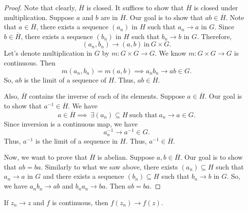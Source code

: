\begin{proof}
    Note that clearly, \( \overline{H} \) is closed. It suffices to show that \( \overline{H} \) is closed under multiplication. Suppose \( a  \) and \( b  \) are in \( \overline{H} \). Our goal is to show that \( ab \in \overline{H} \). Note that \( a \in \overline{H} \), there exists a sequence \( ({a}_{n}) \) in \( H  \) such that \( {a}_{n} \to a  \) in \( G  \). Since \( b \in \overline{H} \), there exists a sequence \( ({b}_{n}) \) in \( H  \) such that \( {b}_{n} \to b  \) in \( G  \). Therefore,
    \[  ({a}_{n}, {b}_{n}) \to (a,b) \ \text{in}  \ G \times G.  \]
    Let's denote multiplication in \( G  \) by \( m : G \times G \to G  \). We know \( m: G \times G \to G  \) is continuous. Then   
    \[  m({a}_{n}, {b}_{n}) = m(a,b) \implies {a}_{n}{b}_{n} \to ab \in G.  \]
    So, \( ab  \) is the limit of a sequence of \( H  \). Thus, \( ab \in \overline{H} \).

    Also, \( \overline{H}   \) contains the inverse of each of its elements. Suppose \( a \in \overline{H} \). Our goal is to show that \( a^{-1} \in \overline{H} \). We have 
    \[  a \in \overline{H} \implies \ \exists ({a}_{n}) \subseteq H  \ \text{such that} \ {a}_{n} \to a \in G. \]
    Since inversion is a continuous map, we have  
    \[  {a}_{n}^{-1} \to a^{-1} \in G.  \]
    Thus, \( a^{-1}  \) is the limit of a sequence in \( H  \). Thus, \( a^{-1} \in \overline{H} \). 

    Now, we want to prove that \( \overline{H} \) is abelian. Suppose \( a,b \in \overline{H} \). Our goal is to show that \( ab = ba  \). Similarly to what we saw above, there exists \( ({a}_{n}) \subseteq  H  \) such that \( {a}_{n} \to a  \) in \( G  \) and there exists a sequence \( ({b}_{n}) \subseteq H   \) such that \( {b}_{n} \to b  \) in \( G  \). So, we have \( {a}_{n}{b}_{n} \to ab \) and \( {b}_{n}{a}_{n} \to ba  \). Then \( ab  = ba \).
\end{proof}

\begin{remark}
   If \( {z}_{n} \to z  \) and \( f  \) is continuous, then \( f({z}_{n}) \to f(z) \). 
\end{remark}



